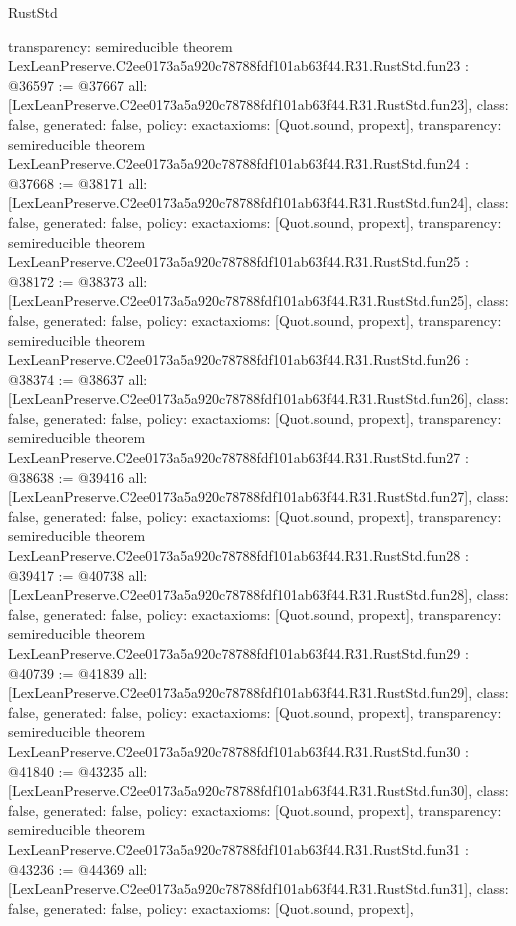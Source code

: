 \begin{lexlean}{RustStd}
\begin{coremodule}
{  transparency: semireducible
}
theorem LexLeanPreserve.C2ee0173a5a920c78788fdf101ab63f44.R31.RustStd.fun23 : @36597 := @37667 {
  all: [LexLeanPreserve.C2ee0173a5a920c78788fdf101ab63f44.R31.RustStd.fun23],
  class: false,
  generated: false,
  policy: exact{axioms: [Quot.sound, propext]},
  transparency: semireducible
}
theorem LexLeanPreserve.C2ee0173a5a920c78788fdf101ab63f44.R31.RustStd.fun24 : @37668 := @38171 {
  all: [LexLeanPreserve.C2ee0173a5a920c78788fdf101ab63f44.R31.RustStd.fun24],
  class: false,
  generated: false,
  policy: exact{axioms: [Quot.sound, propext]},
  transparency: semireducible
}
theorem LexLeanPreserve.C2ee0173a5a920c78788fdf101ab63f44.R31.RustStd.fun25 : @38172 := @38373 {
  all: [LexLeanPreserve.C2ee0173a5a920c78788fdf101ab63f44.R31.RustStd.fun25],
  class: false,
  generated: false,
  policy: exact{axioms: [Quot.sound, propext]},
  transparency: semireducible
}
theorem LexLeanPreserve.C2ee0173a5a920c78788fdf101ab63f44.R31.RustStd.fun26 : @38374 := @38637 {
  all: [LexLeanPreserve.C2ee0173a5a920c78788fdf101ab63f44.R31.RustStd.fun26],
  class: false,
  generated: false,
  policy: exact{axioms: [Quot.sound, propext]},
  transparency: semireducible
}
theorem LexLeanPreserve.C2ee0173a5a920c78788fdf101ab63f44.R31.RustStd.fun27 : @38638 := @39416 {
  all: [LexLeanPreserve.C2ee0173a5a920c78788fdf101ab63f44.R31.RustStd.fun27],
  class: false,
  generated: false,
  policy: exact{axioms: [Quot.sound, propext]},
  transparency: semireducible
}
theorem LexLeanPreserve.C2ee0173a5a920c78788fdf101ab63f44.R31.RustStd.fun28 : @39417 := @40738 {
  all: [LexLeanPreserve.C2ee0173a5a920c78788fdf101ab63f44.R31.RustStd.fun28],
  class: false,
  generated: false,
  policy: exact{axioms: [Quot.sound, propext]},
  transparency: semireducible
}
theorem LexLeanPreserve.C2ee0173a5a920c78788fdf101ab63f44.R31.RustStd.fun29 : @40739 := @41839 {
  all: [LexLeanPreserve.C2ee0173a5a920c78788fdf101ab63f44.R31.RustStd.fun29],
  class: false,
  generated: false,
  policy: exact{axioms: [Quot.sound, propext]},
  transparency: semireducible
}
theorem LexLeanPreserve.C2ee0173a5a920c78788fdf101ab63f44.R31.RustStd.fun30 : @41840 := @43235 {
  all: [LexLeanPreserve.C2ee0173a5a920c78788fdf101ab63f44.R31.RustStd.fun30],
  class: false,
  generated: false,
  policy: exact{axioms: [Quot.sound, propext]},
  transparency: semireducible
}
theorem LexLeanPreserve.C2ee0173a5a920c78788fdf101ab63f44.R31.RustStd.fun31 : @43236 := @44369 {
  all: [LexLeanPreserve.C2ee0173a5a920c78788fdf101ab63f44.R31.RustStd.fun31],
  class: false,
  generated: false,
  policy: exact{axioms: [Quot.sound, propext]},
}
\end{coremodule}
\end{lexlean}
